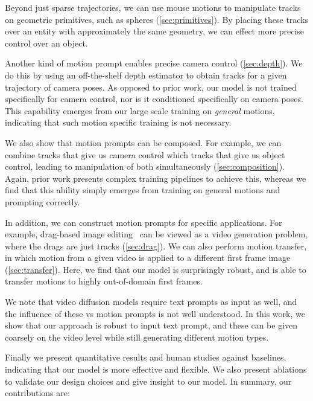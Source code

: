 {Beyond just sparse trajectories, we can use mouse motions to manipulate tracks on geometric primitives, such as spheres (\cref{sec:primitives}). By placing these tracks over an entity with approximately the same geometry, we can effect more precise control over an object.

Another kind of motion prompt enables precise camera control (\cref{sec:depth}). We do this by using an off-the-shelf depth estimator to obtain tracks for a given trajectory of camera poses. As opposed to prior work, our model is not trained specifically for camera control, nor is it conditioned specifically on camera poses. This capability emerges from our large scale training on {\it general} motions, indicating that such motion specific training is not necessary.

We also show that motion prompts can be composed. For example, we can combine tracks that give us camera control which tracks that give us object control, leading to manipulation of both simultaneously (\cref{sec:composition}). Again, prior work presents complex training pipelines to achieve this, whereas we find that this ability simply emerges from training on general motions and prompting correctly.

In addition, we can construct motion prompts for specific applications. For example, drag-based image editing~\cite{pan2023drag,shi2023dragdiffusion,mou2023dragondiffusion,geng2024motion} can be viewed as a video generation problem, where the drags are just tracks (\cref{sec:drag}). We can also perform motion transfer, in which motion from a given video is applied to a different first frame image (\cref{sec:transfer}). Here, we find that our model is surprisingly robust, and is able to transfer motions to highly out-of-domain first frames.

We note that video diffusion models require text prompts as input as well, and the influence of these vs motion prompts is not well understood. In this work, we show that our approach is robust to input text prompt, and these can be given coarsely on the video level while still generating different motion types. 

Finally we present quantitative results and human studies against baselines, indicating that our model is more effective and flexible. We also present ablations to validate our design choices and give insight to our model. In summary, our contributions are:

}
